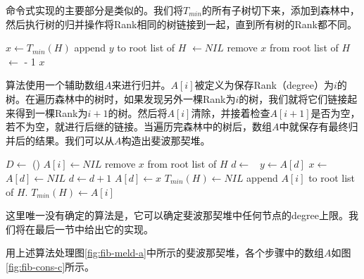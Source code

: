 \documentclass{ctexart}
\begin{document}
命令式实现的主要部分是类似的。我们将$T_{min}$的所有子树切下来，添加到森林中，然后执行树的归并操作将Rank相同的树链接到一起，直到所有树的Rank都不同。

\begin{algorithmic}[1]
  \State $x \gets T_{min}(H)$
      \State append $y$ to root list of $H$
      \State {} $\gets NIL$
    \EndFor
    \State remove $x$ from root list of $H$
    \State {} $\gets$  - 1
    \State {}
  \EndIf
  \State \Return $x$
\EndFunction
\end{algorithmic}

算法使用一个辅助数组$A$来进行归并。$A[i]$被定义为保存Rank（degree）为$i$的树。在遍历森林中的树时，如果发现另外一棵Rank为$i$的树，我们就将它们链接起来得到一棵Rank为$i+1$的树。然后将$A[i]$清除，并接着检查$A[i+1]$是否为空，若不为空，就进行后继的链接。当遍历完森林中的树后，数组$A$中就保存有最终归并后的结果。我们可以从$A$构造出斐波那契堆。

\begin{algorithmic}[1]
  \State $D \gets $ ()
    \State $A[i] \gets NIL$
  \EndFor
    \State remove $x$ from root list of $H$
    \State $d \gets $ 
    \
      \State $y \gets A[d]$
      \State $x \gets $ 
      \State $A[d] \gets NIL$
      \State $d \gets d + 1$
    \EndWhile
    \State $A[d] \gets x$
  \EndFor
  \State $T_{min}(H) \gets NIL$ 
      \State append $A[i]$ to root list of $H$.
        \State $T_{min}(H) \gets A[i]$
      \EndIf
    \EndIf
  \EndFor
\EndFunction
\end{algorithmic}

这里唯一没有确定的算法是，它可以确定斐波那契堆中任何节点的degree上限。我们将在最后一节中给出它的实现。

用上述算法处理图\ref{fig:fib-meld-a}中所示的斐波那契堆，各个步骤中的数组$A$如图\ref{fig:fib-cons-c}所示。
\end{document}
